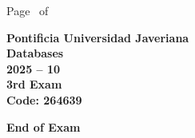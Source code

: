 \documentclass[11pt, addpoints, answers]{exam}\usepackage[utf8]{inputenc}
\begin{document}
\begin{coverpages}
\begin{center}
			\vspace{3mm}
			\leavevmode \hspace{5mm} 
		\end{center}
	\end{coverpages}

	\footer{} {Page \thepage\ of \numpages} {}

	\centering
	\textbf{\Large Pontificia Universidad Javeriana}\\
	\textbf{\Large Databases} \\
	\textbf{\large 2025 -- 10} \\
	\textbf{\large 3rd Exam} \\
	\textbf{Code: 264639}


	\begin{questions}
		
		
		
		
		
		
		
		
		
		
		
		
		
		
		
		
		
		
		
		
	\end{questions}

	\vspace{5mm}
	\noindent \textbf{End of Exam}
\end{document}
